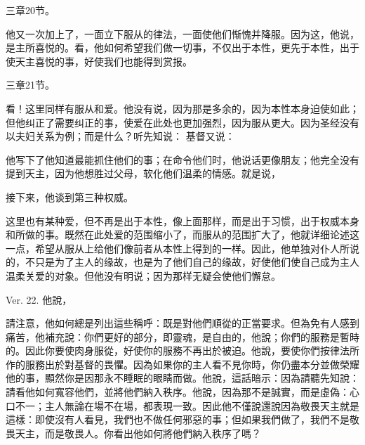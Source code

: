 三章20节。\par

他又一次加上了，一面立下服从的律法，一面使他们惭愧并降服。因为这，他说，是主所喜悦的。看，他如何希望我们做一切事，不仅出于本性，更先于本性，出于使天主喜悦的事，好使我们也能得到赏报。\par

三章21节。\par

看！这里同样有服从和爱。他没有说，因为那是多余的，因为本性本身迫使如此；但他纠正了需要纠正的事，使爱在此处也更加强烈，因为服从更大。因为圣经没有以夫妇关系为例；而是什么？听先知说： 基督又说：\par

\par

他写下了他知道最能抓住他们的事；在命令他们时，他说话更像朋友；他完全没有提到天主，因为他想胜过父母，软化他们温柔的情感。就是说，\par

接下来，他谈到第三种权威。\par

这里也有某种爱，但不再是出于本性，像上面那样，而是出于习惯，出于权威本身和所做的事。既然在此处爱的范围缩小了，而服从的范围扩大了，他就详细论述这一点，希望从服从上给他们像前者从本性上得到的一样。因此，他单独对仆人所说的，不只是为了主人的缘故，也是为了他们自己的缘故，好使他们使自己成为主人温柔关爱的对象。但他没有明说；因为那样无疑会使他们懈怠。\par

Ver. 22. 他說，\par

請注意，他如何總是列出這些稱呼：既是對他們順從的正當要求。但為免有人感到痛苦，他補充說：你們更好的部分，即靈魂，是自由的，他說；你們的服務是暫時的。因此你要使肉身服從，好使你的服務不再出於被迫。他說，要使你們按律法所作的服務出於對基督的畏懼。因為如果你的主人看不見你時，你仍盡本分並做榮耀他的事，顯然你是因那永不睡眠的眼睛而做。他說，這話暗示：因為請聽先知說：請看他如何寬容他們，並將他們納入秩序。他說，因為那不是誠實，而是虛偽：心口不一；主人無論在場不在場，都表現一致。因此他不僅說還說因為敬畏天主就是這樣：即使沒有人看見，我們也不做任何邪惡的事；但如果我們做了，我們不是敬畏天主，而是敬畏人。你看出他如何將他們納入秩序了嗎？\par

